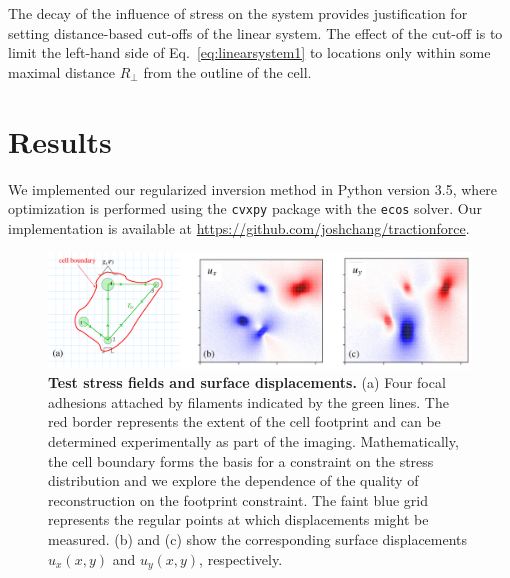 \documentclass[aps,prl,reprint,twocolumn,groupedaddress,showpacs]{revtex4}
\newcommand{\bsigma}{{\boldsymbol\sigma}}
\def\r{{\bf r}}
\begin{document}
The decay of the influence of stress on the system provides
justification for setting distance-based cut-offs of the linear
system. The effect of the cut-off is to limit the left-hand side of
Eq.~\ref{eq:linearsystem1} to locations only within some maximal
distance $R_{\perp}$ from the outline of the cell.




\section{Results}

We implemented our regularized inversion method in Python version 3.5,
where optimization is performed using the \texttt{cvxpy} package with
the \texttt{ecos} solver.  Our implementation is available at
\url{https://github.com/joshchang/tractionforce}. 

\begin{figure}[ht]
\begin{center}
\includegraphics[width=5.2in]{fig2.pdf}
%
\caption{\textbf{Test stress fields and surface displacements.} (a)
  Four focal adhesions attached by filaments indicated by the green
  lines. The red border represents the extent of the cell footprint
  and can be determined experimentally as part of the imaging.
  Mathematically, the cell boundary forms the basis for a constraint
  on the stress distribution and we explore the dependence of the
  quality of reconstruction on the footprint constraint. The faint
  blue grid represents the regular points at which displacements might
  be measured. (b) and (c) show the corresponding surface
  displacements $u_{x}(x,y)$ and $u_{y}(x,y)$,
  respectively.\label{TEST}}
\end{center}
\end{figure}
%
\end{document}
